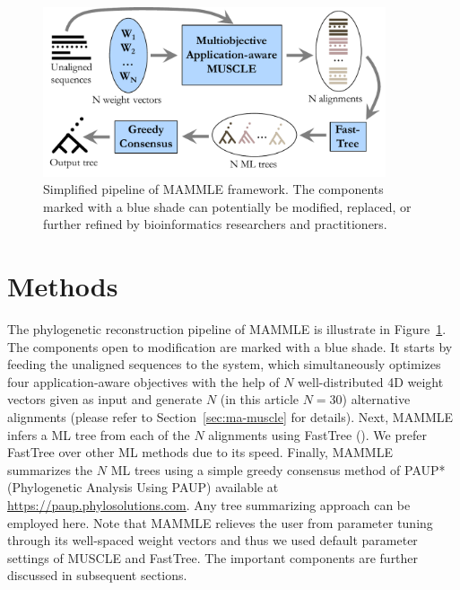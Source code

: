 \begin{figure}[!htbp]
	\centering
	\includegraphics[width=0.9\textwidth]{Figure/workflow.pdf}
	\caption[Simplified pipeline of MAMMLE framework.]{Simplified pipeline of MAMMLE framework. The components marked with a blue shade can potentially be modified, replaced, or further refined by bioinformatics researchers and practitioners.}
	\label{fig:workflow}
\end{figure}
\vspace{-8 mm}

\section{Methods}
The phylogenetic reconstruction pipeline of MAMMLE is illustrate in Figure~\ref{fig:workflow}. The components open to modification are marked with a blue shade. It starts by feeding the unaligned sequences to the system, which simultaneously optimizes four application-aware objectives with the help of $N$ well-distributed 4D weight vectors given as input and generate $N$ (in this article $N=30$) alternative alignments (please refer to Section~\ref{sec:ma-muscle} for details). %
Next, MAMMLE infers a ML tree from each of the $N$ alignments using FastTree (\cite{price2010fasttree}). We prefer FastTree over other ML methods due to its speed. Finally, MAMMLE summarizes the $N$ ML trees using a simple greedy consensus method of PAUP* (Phylogenetic Analysis Using PAUP) available at \url{https://paup.phylosolutions.com}. Any tree summarizing approach can be employed here. Note that MAMMLE relieves the user from parameter tuning through its well-spaced weight vectors and thus we used default parameter settings of MUSCLE and FastTree. The important components are further discussed in subsequent sections.

